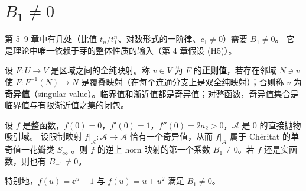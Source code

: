 \section{\texorpdfstring{$B_1\ne0$}{B1 != 0}}\label{ch3:sec:B1}

第 5--9 章中有几处（比值 $t_n/t_1^n$、对数形式的一阶律、$c_1\ne0$）需要 $B_1\ne0$。
它是理论中唯一依赖于芽的整体性质的输入（第 4 章假设 (H5)）。

\begin{definition}[奇异值]\label{ch3:def:singular}
设 $F:U\to V$ 是区域之间的全纯映射。称 $v\in V$ 为 $F$ 的\textbf{正则值}，若存在邻域
$N\ni v$ 使 $F:F^{-1}(N)\to N$ 是覆叠映射（在每个连通分支上是双全纯映射）；否则称 $v$
为\textbf{奇异值}（singular value）。临界值和渐近值都是奇异值；对整函数，奇异值集合是
临界值与有限渐近值之集的闭包。
\end{definition}

\begin{proposition}[$B_1\ne0$]\label{prop:B1-nonzero}
设 $f$ 是整函数，$f(0)=0$，$f'(0)=1$，$f''(0)=2a_2>0$，$\mathcal A$ 是 $0$ 的直接抛物吸引域。
设限制映射 $f|_{\mathcal A}:\mathcal A\to\mathcal A$ 恰有一个奇异值，从而 $f|_{\mathcal A}$ 属于
Chéritat 的单奇值一花瓣类 $S_\infty$ \cite[Definition~8]{Cheritat2022}。则 $f$ 的逆上 horn
映射的第一个系数 $B_1\ne0$。若 $f$ 还是实函数，则也有 $B_{-1}\ne0$。

特别地，$f(u)=\ee^u-1$ 与 $f(u)=u+u^2$ 满足 $B_1\ne0$。
\end{proposition}

